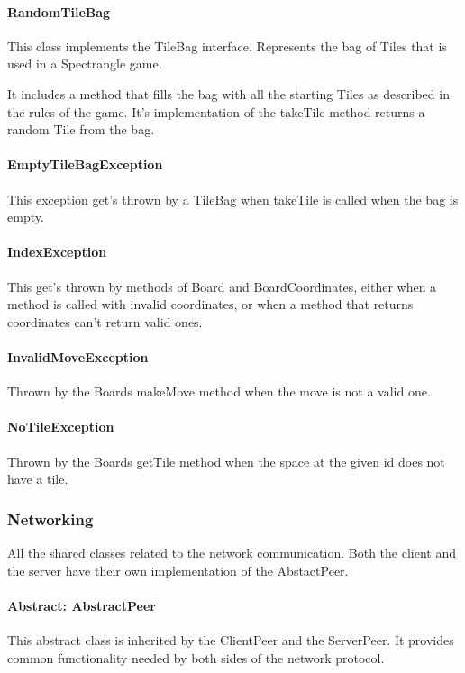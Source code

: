 \documentclass[12pt, letterpaper]{article}
\begin{document}
    \paragraph{RandomTileBag}
    This class implements the TileBag interface.
    Represents the bag of Tiles that is used in a Spectrangle game.

    It includes a method that fills the bag with all the starting Tiles as described in the rules of the game.
    It's implementation of the takeTile method returns a random Tile from the bag.

    \paragraph{EmptyTileBagException}
    This exception get's thrown by a TileBag when takeTile is called when the bag is empty.

    \paragraph{IndexException}
    This get's thrown by methods of Board and BoardCoordinates, either when a method is called with invalid
    coordinates, or when a method that returns coordinates can't return valid ones.

    \paragraph{InvalidMoveException}
    Thrown by the Boards makeMove method when the move is not a valid one.

    \paragraph{NoTileException}
    Thrown by the Boards getTile method when the space at the given id does not have a tile.


    \subsubsection{Networking}

    All the shared classes related to the network communication.
    Both the client and the server have their own implementation of the AbstactPeer.

    \paragraph{Abstract: AbstractPeer}
    This abstract class is inherited by the ClientPeer and the ServerPeer.
    It provides common functionality needed by both sides of the network protocol.
\end{document}
